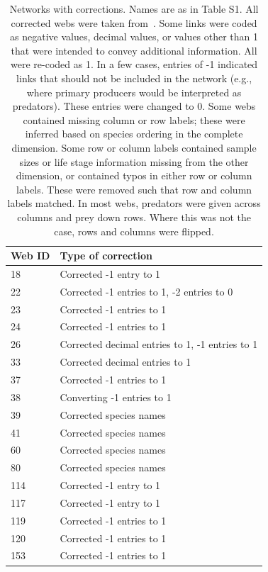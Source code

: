 \documentclass[12pt]{article}
\begin{document}
  \clearpage
  \begin{center}
    \begin{table}[h!]
      \caption{Networks with corrections. Names are as in Table S1. All corrected webs were taken from~\cite{GlobalWeb}. Some links were coded as negative values, decimal values, or values other than 1 that were intended to convey additional information. All were re-coded as 1. In a few cases, entries of -1 indicated links that should not be included in the network (e.g., where primary producers would be interpreted as predators). These entries were changed to 0. Some webs contained missing column or row labels; these were inferred based on species ordering in the complete dimension. Some row or column labels contained sample sizes or life stage information missing from the other dimension, or contained typos in either row or column labels. These were removed such that row and column labels matched. In most webs, predators were given across columns and prey down rows. Where this was not the case, rows and columns were flipped.}
      \label{S2}
      {\footnotesize
      \begin{tabular}{l | p{13cm}}
      Web ID & Type of correction \\
      \hline
      18 & Corrected -1 entry to 1 \\
      22 &  Corrected -1 entries to 1, -2 entries to 0 \\
      23 & Corrected -1 entries to 1 \\
      24 &  Corrected -1 entries to 1 \\
      26 & Corrected decimal entries to 1, -1 entries to 1 \\
      33 & Corrected decimal entries to 1 \\
      37 & Corrected -1 entries to 1 \\
      38 & Converting -1 entries to 1 \\
      39 & Corrected species names \\
      41 & Corrected species names \\
      60 & Corrected species names \\
      80 & Corrected species names \\
      114 & Corrected -1 entry to 1 \\
      117 & Corrected -1 entry to 1 \\
      119 & Corrected -1 entries to 1 \\
      120 & Corrected -1 entries to 1 \\
      153 & Corrected -1 entries to 1 \\

\end{tabular}}
\end{table}
\end{center}
\end{document}
